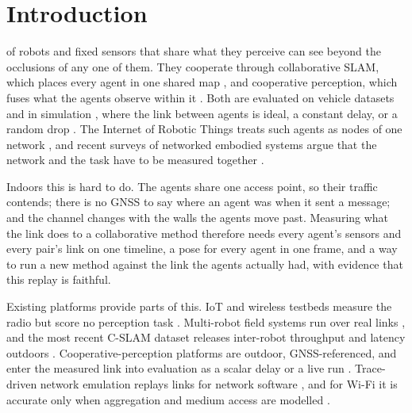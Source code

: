 \section{Introduction}
\label{sec:introduction}
 of robots and fixed sensors that share what they
perceive can see beyond the occlusions of any one of them. They
cooperate through collaborative SLAM, which places every agent in one
shared map \cite{swarmslam,doorslam,kimeramulti}, and cooperative
perception, which fuses what the agents observe within it
\cite{where2comm,zhou2022gnnperception}. Both are evaluated on vehicle
datasets and in simulation \cite{opv2v,v2xsim,dairv2x,v2v4real}, where
the link between agents is ideal, a constant delay, or a random drop
\cite{v2xvit,lei2022syncnet,wei2023cobevflow}. The Internet of Robotic
Things treats such agents as nodes of one network
\cite{simoens2018iort}, and recent surveys of networked embodied systems
argue that the network and the task have to be measured together
\cite{zhang2026mean,wen2026embodiedmrs}.

Indoors this is hard to do. The agents share one access point, so their
traffic contends; there is no GNSS to say where an agent was when it
sent a message; and the channel changes with the walls the agents move
past. Measuring what the link does to a collaborative method therefore
needs every agent's sensors and every pair's link on one timeline, a
pose for every agent in one frame, and a way to run a new method against
the link the agents actually had, with evidence that this replay is
faithful.

Existing platforms provide parts of this. IoT and wireless testbeds
measure the radio but score no perception task
\cite{adjih2015iotlab,breen2021powder,bonati2021colosseum}. Multi-robot
field systems run over real links
\cite{ginting2021chord,saboia2022achord,cladera2024mocha}, and the most
recent C-SLAM dataset releases inter-robot throughput and latency
outdoors \cite{planetary_cslam}. Cooperative-perception platforms are
outdoor, GNSS-referenced, and enter the measured link into evaluation as
a scalar delay or a live run
\cite{v2v4real,zimmer2024tumtrafv2x,v2xrealo,cooperscene}. Trace-driven
network emulation replays links for network software
\cite{noble1997trace,netravali2015mahimahi,yan2018pantheon}, and for
Wi-Fi it is accurate only when aggregation and medium access are
modelled \cite{syed2020wifiemu,nemfi}.

